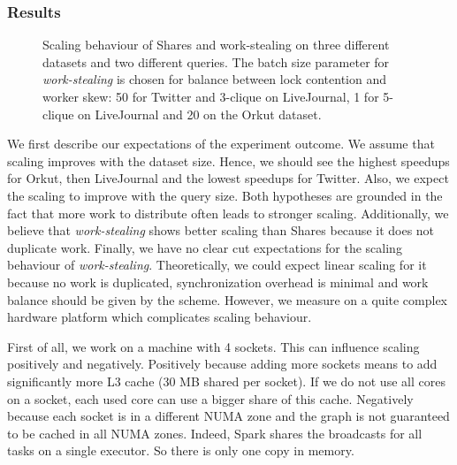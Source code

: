 
\subsubsection{Results}

\begin{figure}
    \centering
    \newline
    \caption{Scaling behaviour of Shares and work-stealing on three different datasets
    and two different queries.
    The batch size parameter for \textit{work-stealing} is chosen for balance between lock contention and worker skew:
    50 for Twitter and 3-clique on LiveJournal, 1 for 5-clique on LiveJournal and 20 on the Orkut dataset.
    }
    \label{fig:graphWCOJ-scaling}
\end{figure}

We first describe our expectations of the experiment outcome.
We assume that scaling improves with the dataset size.
Hence, we should see the highest speedups for Orkut, then LiveJournal and the lowest speedups for Twitter.
Also, we expect the scaling to improve with the query size.
Both hypotheses are grounded in the fact that more work to distribute often leads to stronger scaling.
Additionally, we believe that \textit{work-stealing} shows better scaling than Shares because it does not duplicate work.
Finally, we have no clear cut expectations for the scaling behaviour of \textit{work-stealing}.
Theoretically, we could expect linear scaling for it because no work is duplicated, synchronization overhead is minimal and
work balance should be given by the scheme.
However, we measure on a quite complex hardware platform which complicates scaling behaviour.

First of all, we work on a machine with 4 sockets.
This can influence scaling positively and negatively.
Positively because adding more sockets means to add significantly more L3 cache (30 MB shared per socket).
If we do not use all cores on a socket, each used core can use a bigger share of this cache.
Negatively because each socket is in a different NUMA zone and the graph is not guaranteed to be cached in all
NUMA zones.
Indeed, Spark shares the broadcasts for all tasks on a single executor.
So there is only one copy in memory.

